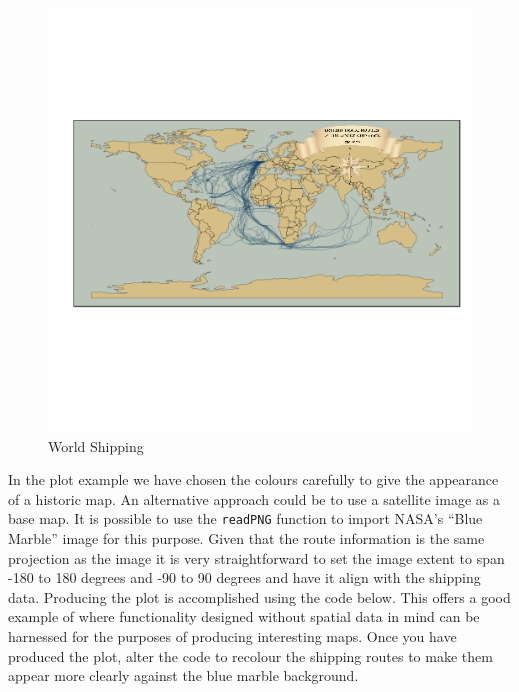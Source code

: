 \documentclass[]{article}
\begin{document}
\begin{figure}[htbp]
\centering
\includegraphics{figure/World_Shipping.png}
\caption{World Shipping}
\end{figure}

In the plot example we have chosen the colours carefully to give the
appearance of a historic map. An alternative approach could be to use a
satellite image as a base map. It is possible to use the
\texttt{readPNG} function to import NASA's ``Blue Marble'' image for
this purpose. Given that the route information is the same projection as
the image it is very straightforward to set the image extent to span
-180 to 180 degrees and -90 to 90 degrees and have it align with the
shipping data. Producing the plot is accomplished using the code below.
This offers a good example of where functionality designed without
spatial data in mind can be harnessed for the purposes of producing
interesting maps. Once you have produced the plot, alter the code to
recolour the shipping routes to make them appear more clearly against
the blue marble background.
\end{document}
